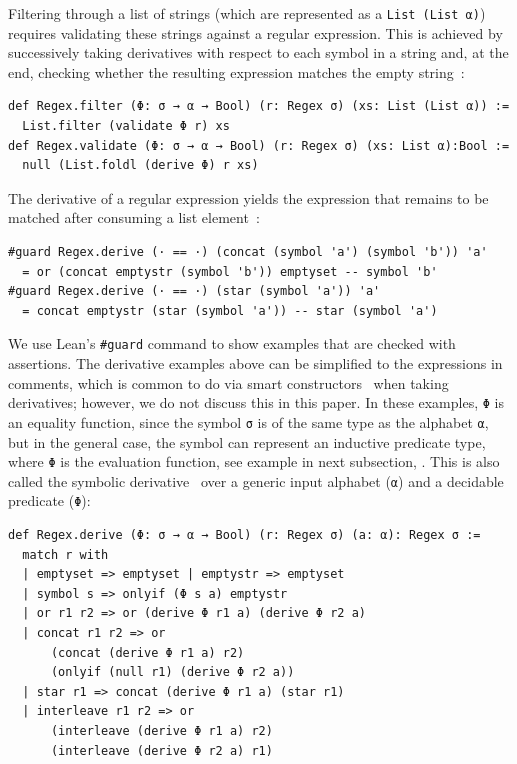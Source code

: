 \documentclass[runningheads]{llncs}
\newcommand{\AnyEqPred}{\link{Pred}{AnyEqPred}}
\begin{document}
Filtering through a list of strings (which are represented as a \lstinline{List (List α)}) requires validating these strings against a regular expression. This is achieved by successively taking derivatives with respect to each symbol in a string and, at the end, checking whether the resulting expression matches the empty string~\cite{brzozowski1964derivatives,reexamined}:
\begin{lstlisting}[label=def Regex.validate]
def Regex.filter (Φ: σ → α → Bool) (r: Regex σ) (xs: List (List α)) :=
  List.filter (validate Φ r) xs
def Regex.validate (Φ: σ → α → Bool) (r: Regex σ) (xs: List α):Bool :=
  null (List.foldl (derive Φ) r xs)
\end{lstlisting}
The derivative of a regular expression yields the expression that remains to be matched after consuming a list element~\cite{brzozowski1964derivatives,reexamined}:
\begin{lstlisting}
#guard Regex.derive (· == ·) (concat (symbol 'a') (symbol 'b')) 'a'
  = or (concat emptystr (symbol 'b')) emptyset -- symbol 'b'
#guard Regex.derive (· == ·) (star (symbol 'a')) 'a'
  = concat emptystr (star (symbol 'a')) -- star (symbol 'a')
\end{lstlisting}
We use Lean's \lstinline{#guard} command to show examples that are checked with assertions.
The derivative examples above can be simplified to the expressions in comments, which is common to do via smart constructors~\cite{reexamined} when taking derivatives; however, we do not discuss this in this paper.
In these examples, \lstinline{Φ} is an equality function, since the symbol \lstinline{σ} is of the same type as the alphabet \lstinline{α}, but in the general case, the symbol can represent an inductive predicate type, where \lstinline{Φ} is the evaluation function, see example in next subsection, \AnyEqPred.
This is also called the symbolic derivative~\cite{stanford2021symbolic,elliott2021symbolic} over a generic input alphabet (\lstinline{α}) and a decidable predicate (\lstinline{Φ}):
\begin{lstlisting}[label=def Regex.derive]
def Regex.derive (Φ: σ → α → Bool) (r: Regex σ) (a: α): Regex σ :=
  match r with
  | emptyset => emptyset | emptystr => emptyset
  | symbol s => onlyif (Φ s a) emptystr
  | or r1 r2 => or (derive Φ r1 a) (derive Φ r2 a)
  | concat r1 r2 => or
      (concat (derive Φ r1 a) r2)
      (onlyif (null r1) (derive Φ r2 a))
  | star r1 => concat (derive Φ r1 a) (star r1)
  | interleave r1 r2 => or
      (interleave (derive Φ r1 a) r2)
      (interleave (derive Φ r2 a) r1)
\end{lstlisting}
\end{document}
